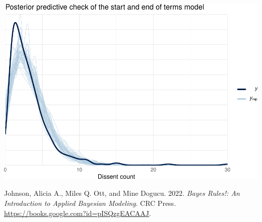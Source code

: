 \documentclass[
  11pt,
]{article}
\newlength{\cslhangindent}
\newenvironment{CSLReferences}[2] %
 {%
  \setlength{\parindent}{0pt}
  \ifodd #1 \everypar{\setlength{\hangindent}{\cslhangindent}}\ignorespaces\fi
  \ifnum #2 > 0
  \setlength{\parskip}{#2\baselineskip}
  \fi
 }%
 {}
\begin{document}
\includegraphics{dissents_article_appendix_files/figure-latex/posterior_check_term-1.pdf}

\hypertarget{refs}{}
\begin{CSLReferences}{1}{0}
\leavevmode{}%
Johnson, Alicia A., Miles Q. Ott, and Mine Dogucu. 2022. \emph{Bayes
{Rules}!: {An Introduction} to {Applied Bayesian Modeling}}. {CRC
Press}. \url{https://books.google.com?id=pISQzgEACAAJ}.

\end{CSLReferences}
\end{document}
